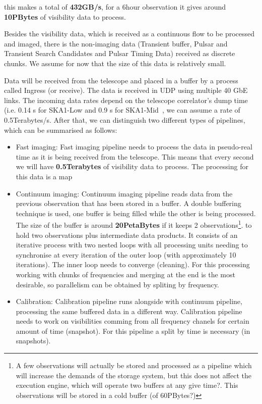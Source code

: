 this makes a total of \textbf{432GB/s}, for a 6hour observation it gives around \textbf{10PBytes} of visibility data to process.

Besides the visibility data, which is received as a continuous flow to be processed and imaged, there is the non-imaging
data (Transient buffer, Pulsar and Transient Search Candidates and Pulsar Timing Data) received as discrete chunks. 
We assume for now that the size of this data is relatively small.

Data will be received from the telescope and placed in a buffer by a process called Ingress (or receive). The data is received in UDP using multiple 
40 GbE links. The incoming data rates depend on the telescope correlator's dump time (i.e. 0.14 s for SKA1-Low and 0.9 s for SKA1-Mid~\cite{ParametricModel}, 
we can assume a rate of 0.5Terabytes/s. After that, we can distinguish two different types of pipelines, which can be 
summarised as follows:
\begin{itemize}
\item Fast imaging: Fast imaging pipeline needs to process the data in pseudo-real time as it is being received from the telescope.
 This means that every second we will have \textbf{0.5Terabytes} of visibility data to process. The processing for this data is a map
\item Continuum imaging: Continuum imaging pipeline reads data from the previous observation that has been stored in a buffer.
A double buffering technique is used, one buffer is being filled while the other is being processed. The size of the buffer is around \textbf{20PetaBytes}
if it keeps 2 observations\footnote{A few observations will actually be stored and processed as a pipeline which will increase the demands of the storage system,
but this does not affect the execution engine, which will operate two buffers at any give time?.
This observations will be stored in a cold buffer (of 60PBytes?)}.
to hold two observations plus intermediate data products. It consists of an iterative process with two nested loops with all processing units needing
to synchronise at every iteration of the outer loop (with approximately 10 iterations). The inner loop needs to converge (cleaning).
For this processing working with chunks of frequencies and merging at the end is the most desirable, so parallelism can be obtained by spliting 
by frequency. 
\item Calibration: Calibration pipeline runs alongside with continuum pipeline, processing the same buffered data in a different way.
Calibration pipeline needs to work on visibilities comming from all frequency chanels for certain amount of time (snapshot). For this pipeline 
a split by time is necessary (in snapshots). 
\end{itemize}


